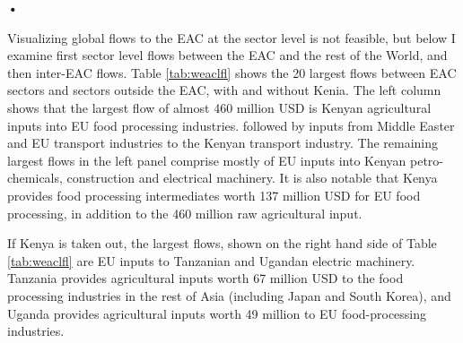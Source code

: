 \textbf{\textbf{•}}\documentclass[a4paper]{article}
\begin{document}
Visualizing global flows to the EAC at the sector level is not feasible, but below I examine first sector level flows between the EAC and the rest of the World, and then inter-EAC flows. Table \ref{tab:weaclfl} shows the 20 largest flows between EAC sectors and sectors outside the EAC, with and without Kenia. The left column shows that the largest flow of almost 460 million USD is Kenyan agricultural inputs into EU food processing industries.  followed by inputs from Middle Easter and EU transport industries to the Kenyan transport industry. The remaining largest flows in the left panel comprise mostly of EU inputs into Kenyan petro-chemicals, construction and electrical machinery.  It is also notable that Kenya provides food processing intermediates worth 137 million USD for EU food processing, in addition to the 460 million raw agricultural input. \newline

If Kenya is taken out, the largest flows, shown on the right hand side of Table \ref{tab:weaclfl} are EU inputs to Tanzanian and Ugandan electric machinery. Tanzania provides agricultural inputs worth 67 million USD to the food processing industries in the rest of Asia (including Japan and South Korea), and Uganda provides agricultural inputs worth 49 million to EU food-processing industries.  
\end{document}

